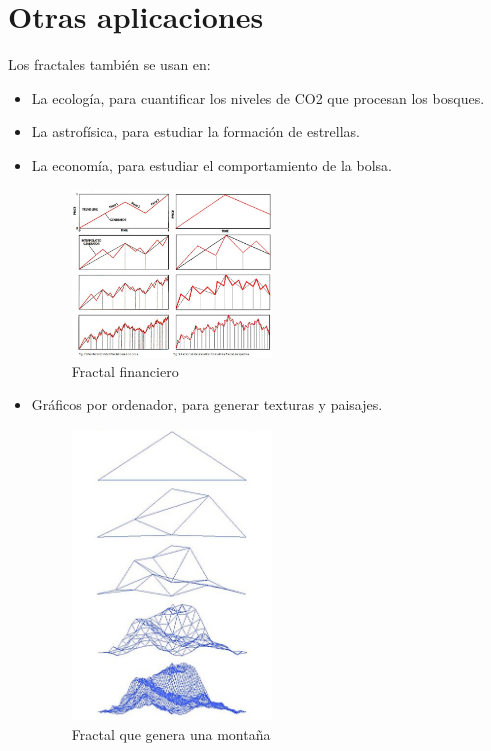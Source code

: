 \section{Otras aplicaciones}

\noindent Los fractales también se usan en:

\begin{itemize}
    \item La ecología, para cuantificar los niveles de CO2 que procesan los bosques. \cite{BBVA-2020}
    \item La astrofísica, para estudiar la formación de estrellas.\cite{BBVA-2020}
    \item La economía, para estudiar el comportamiento de la bolsa.\cite{BBVA-2020}
    
    \begin{figure}[H]
        \centering
        \includegraphics[width=0.5\textwidth]{figures/fractal-economy.jpg}
        \caption{Fractal financiero}
        \label{fig:fractal-economy}
    \end{figure}

    \item Gráficos por ordenador, para generar texturas y paisajes.
    
    \begin{figure}[H]
        \centering
        \includegraphics[width=0.5\textwidth]{figures/fractal-mountain.jpg}
        \caption{Fractal que genera una montaña}
        \label{fig:fractal-mountain}
    \end{figure}

\end{itemize}
